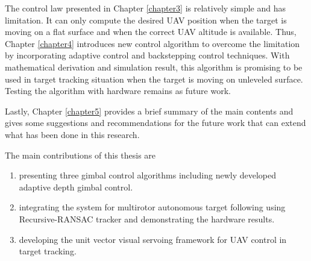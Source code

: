 The control law presented in Chapter \ref{chapter3} is relatively simple and has limitation. It can only compute the desired UAV position when the target is moving on a flat surface and when the correct UAV altitude is available. Thus, Chapter \ref{chapter4} introduces new control algorithm to overcome the limitation by incorporating adaptive control and backstepping control techniques. With mathematical derivation and simulation result, this algorithm is promising to be used in target tracking situation when the target is moving on unleveled surface. Testing the algorithm with hardware remains as future work. 

Lastly, Chapter \ref{chapter5} provides a brief summary of the main contents and gives some suggestions and recommendations for the future work that can extend what has been done in this research. 

The main contributions of this thesis are
\begin{enumerate}
	\item presenting three gimbal control algorithms including newly developed adaptive depth gimbal control.
	\item integrating the system for multirotor autonomous target following using Recursive-RANSAC tracker and demonstrating the hardware results.
	\item developing the unit vector visual servoing framework for UAV control in target tracking.
\end{enumerate}